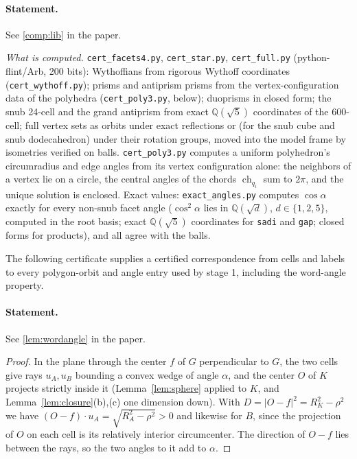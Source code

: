 \documentclass[11pt]{article}
\theoremstyle{definition}
\theoremstyle{remark}
\newcommand{\Q}{\mathbb{Q}}
\newcommand{\ch}{\operatorname{ch}}
\begin{document}
\setcounter{theorem}{2}
\paragraph{Statement.} See \ref{comp:lib} in the paper.


\noindent\emph{What is computed.} \texttt{cert\_facets4.py},
\texttt{cert\_star.py}, \texttt{cert\_full.py} (python-flint/Arb,
200 bits): Wythoffians from rigorous Wythoff coordinates
(\texttt{cert\_wythoff.py}); prisms and antiprism prisms from the
vertex-configuration data of the polyhedra (\texttt{cert\_poly3.py},
below); duoprisms in closed form; the snub 24-cell and the grand
antiprism from exact $\Q(\sqrt5)$ coordinates of the 600-cell; full
vertex sets as orbits under exact reflections or (for the snub cube and
snub dodecahedron) under their rotation groups, moved into the model
frame by isometries verified on balls. \texttt{cert\_poly3.py} computes a
uniform polyhedron's circumradius and edge angles from its vertex
configuration alone: the neighbors of a vertex lie on a circle, the
central angles of the chords $\ch_{q_i}$ sum to $2\pi$, and the unique
solution is enclosed. Exact values: \texttt{exact\_angles.py} computes
$\cos\alpha$ exactly for every non-snub facet angle ($\cos^2\alpha$ lies
in $\Q(\sqrt d)$, $d\in\{1,2,5\}$, computed in the root basis; exact
$\Q(\sqrt5)$ coordinates for \texttt{sadi} and \texttt{gap}; closed forms
for products), and all agree with the balls.

The following certificate supplies a certified correspondence from cells
and labels to every polygon-orbit and angle entry used by stage 1,
including the word-angle property.

\paragraph{Statement.} See \ref{lem:wordangle} in the paper.

\begin{proof}
In the plane through the center $f$ of $G$ perpendicular to $G$, the two
cells give rays $u_A,u_B$ bounding a convex wedge of angle $\alpha$, and
the center $O$ of $K$ projects strictly inside it (Lemma~\ref{lem:sphere}
applied to $K$, and Lemma~\ref{lem:closure}(b),(c) one dimension down).
With $D=|O-f|^2=R_K^2-\rho^2$ we have $(O-f)\cdot u_A=\sqrt{R_A^2-\rho^2}>0$
and likewise for $B$, since the projection of $O$ on each cell is its
relatively interior circumcenter. The direction of $O-f$ lies between the
rays, so the two angles to it add to $\alpha$.
\end{proof}
\end{document}
